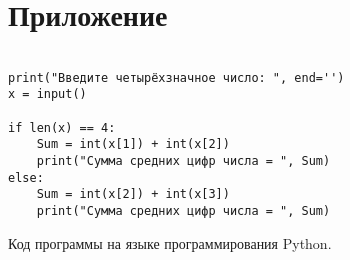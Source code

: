 \documentclass[14pt, oneside]{altsu-report}
\begin{document}
\newpage
\chapter*{Приложение}
\begin{listing}[ht]
\begin{verbatim}

print("Введите четырёхзначное число: ", end='')
x = input()

if len(x) == 4:
    Sum = int(x[1]) + int(x[2])
    print("Сумма средних цифр числа = ", Sum)
else:
    Sum = int(x[2]) + int(x[3])
    print("Сумма средних цифр числа = ", Sum)

\end{verbatim}
\caption{Код программы на языке программирования Python.}
\label{lst:example1}
\end{listing}
\end{document}
